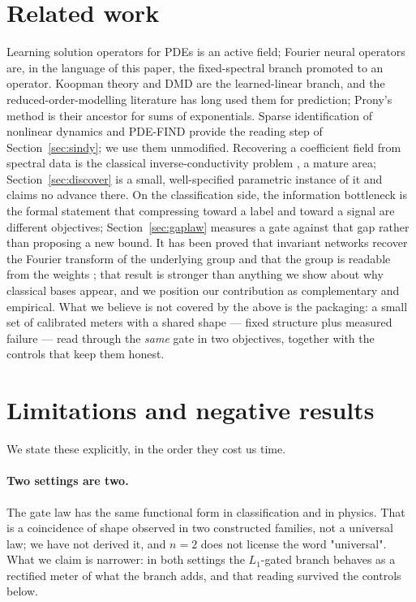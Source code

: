 \documentclass[11pt,a4paper]{article}
\begin{document}
\section{Related work}\label{sec:related}
Learning solution operators for PDEs is an active field; Fourier neural operators \cite{fno} are, in the language of this paper, the fixed-spectral branch promoted to an operator. Koopman theory and DMD \cite{mezic,schmid} are the learned-linear branch, and the reduced-order-modelling literature has long used them for prediction; Prony's method \cite{prony} is their ancestor for sums of exponentials. Sparse identification of nonlinear dynamics \cite{sindy} and PDE-FIND \cite{pdefind} provide the reading step of Section~\ref{sec:sindy}; we use them unmodified. Recovering a coefficient field from spectral data is the classical inverse-conductivity problem \cite{calderon}, a mature area; Section~\ref{sec:discover} is a small, well-specified parametric instance of it and claims no advance there. On the classification side, the information bottleneck \cite{tishby} is the formal statement that compressing toward a label and toward a signal are different objectives; Section~\ref{sec:gaplaw} measures a gate against that gap rather than proposing a new bound. It has been proved that invariant networks recover the Fourier transform of the underlying group and that the group is readable from the weights \cite{harmonics}; that result is stronger than anything we show about why classical bases appear, and we position our contribution as complementary and empirical. What we believe is not covered by the above is the packaging: a small set of calibrated meters with a shared shape — fixed structure plus measured failure — read through the \emph{same} gate in two objectives, together with the controls that keep them honest.

\section{Limitations and negative results}\label{sec:limits}
We state these explicitly, in the order they cost us time.

\paragraph{Two settings are two.} The gate law has the same functional form in classification and in physics. That is a coincidence of shape observed in two constructed families, not a universal law; we have not derived it, and $n=2$ does not license the word "universal". What we claim is narrower: in both settings the $L_1$-gated branch behaves as a rectified meter of what the branch adds, and that reading survived the controls below.
\end{document}
